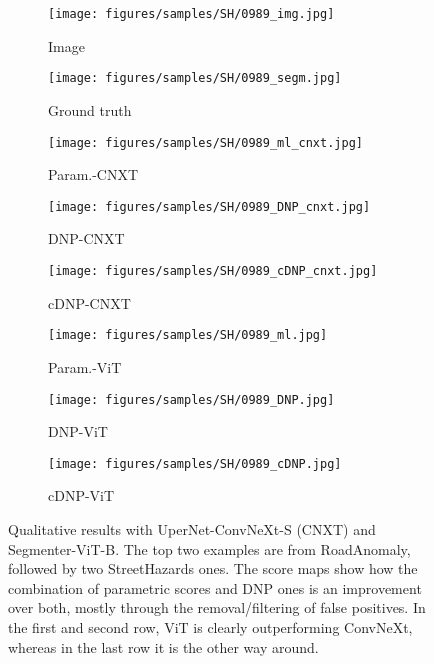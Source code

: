 \documentclass[10pt,twocolumn,letterpaper]{article}
\begin{document}
\begin{figure*}[h!]
    \begin{subfigure}[b]{0.11\textwidth}
        \centering
        \texttt{[image: figures/samples/SH/0989\_img.jpg]}
        \caption*{\scriptsize Image}
    \end{subfigure}
    \begin{subfigure}[b]{0.11\textwidth}
        \centering
        \texttt{[image: figures/samples/SH/0989\_segm.jpg]}
        \caption*{\scriptsize Ground truth}
    \end{subfigure}
    \hspace{3px}
    \begin{subfigure}[b]{0.11\textwidth}
        \centering
        \texttt{[image: figures/samples/SH/0989\_ml\_cnxt.jpg]}
        \caption*{\scriptsize Param.-CNXT}
    \end{subfigure}
    \begin{subfigure}[b]{0.11\textwidth}
        \centering
        \texttt{[image: figures/samples/SH/0989\_DNP\_cnxt.jpg]}
        \caption*{\scriptsize DNP-CNXT}
    \end{subfigure}
    \begin{subfigure}[b]{0.11\textwidth}
        \centering
        \texttt{[image: figures/samples/SH/0989\_cDNP\_cnxt.jpg]}
        \caption*{\scriptsize cDNP-CNXT}
    \end{subfigure}
    \hspace{3px}
    \begin{subfigure}[b]{0.11\textwidth}
        \centering
        \texttt{[image: figures/samples/SH/0989\_ml.jpg]}
        \caption*{\scriptsize Param.-ViT}
    \end{subfigure}
    \begin{subfigure}[b]{0.11\textwidth}
        \centering
        \texttt{[image: figures/samples/SH/0989\_DNP.jpg]}
        \caption*{\scriptsize DNP-ViT}
    \end{subfigure}
    \begin{subfigure}[b]{0.11\textwidth}
        \centering
        \texttt{[image: figures/samples/SH/0989\_cDNP.jpg]}
        \caption*{\scriptsize cDNP-ViT}
    \end{subfigure}
\caption{Qualitative results with UperNet-ConvNeXt-S (CNXT) and Segmenter-ViT-B. The top two examples are from RoadAnomaly, followed by two StreetHazards ones. The score maps show how the combination of parametric scores and DNP ones is an improvement over both, mostly through the removal/filtering of false positives. In the first and second row, ViT is clearly outperforming ConvNeXt, whereas in the last row it is the other way around.
}
\end{figure*}
\end{document}
